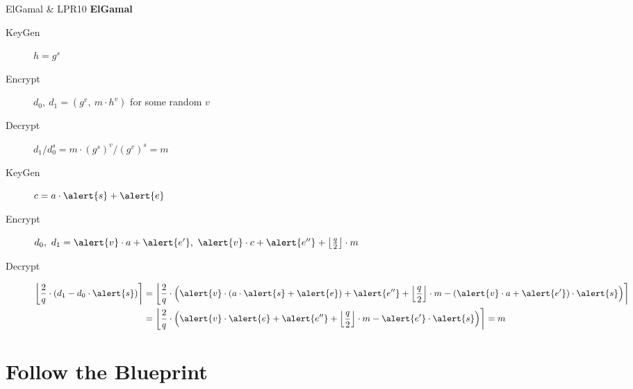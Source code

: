 \documentclass[xcolor=table,10pt,aspectratio=169]{beamer}
\begin{document}
\begin{frame}[label={sec:org6d6a974}]{ElGamal \& LPR10}
\textbf{ElGamal}

\begin{description}
\item[{KeyGen}] \(h = g^{s}\)
\item[{Encrypt}] \(d_{0},\ d_{1} = \left({g^{v},\  m \cdot h^{v}}\right)\) for some random \(v\)
\item[{Decrypt}] \(d_{1} / d_{0}^{s} = m \cdot (g^{s})^{v} / (g^{v})^{s} = m\)
\end{description}

\textbf{\cite{EC:LyuPeiReg10}}

\begin{description}
\item[{KeyGen}] \(c = a \cdot \alert{s} + \alert{e}\)
\item[{Encrypt}] \(d_{0}, \ d_{1} = \alert{v} \cdot a + \alert{e'},\ \alert{v} \cdot c + \alert{e''} +\left\lfloor \frac{q}{2} \right\rfloor  \cdot m\)
\item[{Decrypt}] \begin{align*}
\left\lfloor \frac{2}{q} \cdot \left(d_{1} - d_{0} \cdot \alert{s}\right) \right\rceil &= \left\lfloor \frac{2}{q} \cdot \left({\alert{v} \cdot (a \cdot \alert{s} + \alert{e}) + \alert{e''} + \left\lfloor \frac{q}{2} \right\rfloor \cdot m - \left(\alert{v} \cdot a + \alert{e'}\right) \cdot \alert{s}}\right) \right\rceil\\
&= \left\lfloor \frac{2}{q} \cdot \left({\alert{v} \cdot \alert{e} + \alert{e''} + \left\lfloor \frac{q}{2} \right\rfloor  \cdot m - \alert{e'} \cdot \alert{s}}\right) \right\rceil = m\\
\end{align*}
\end{description}
\end{frame}
\section{Follow the Blueprint}
\label{sec:org12db82d}
\end{document}
